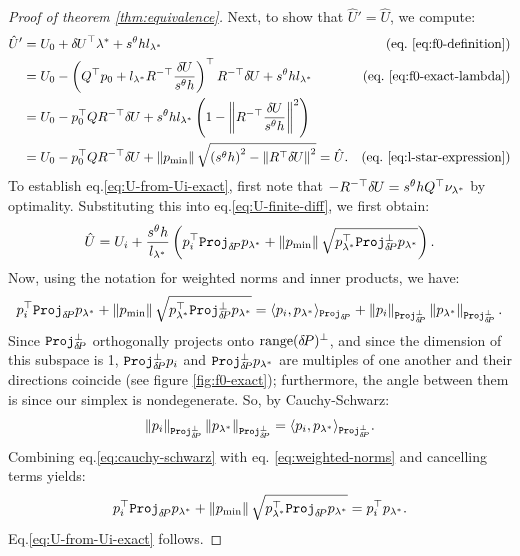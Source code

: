 \documentclass[smallcondensed]{svjour3}
\begin{document}
\begin{proof}[Proof of theorem \ref{thm:equivalence}]
  Next, to show that $\hat{U}' = \hat{U}$, we compute:
  \begin{align*}
    \hat{U}'
    &= U_0 + \delU^\top \lambda^* + s^\theta h l_{\lambda^*} & \mbox{(eq.\@ \ref{eq:f0-definition})} \\
    &= U_0 - \parens{Q^\top p_0 + l_{\lambda^*} R^{-\top} \frac{\delU}{s^\theta h}}^\top R^{-\top} \delU + s^\theta h l_{\lambda^*} & \mbox{(eq.\@ \ref{eq:f0-exact-lambda})} \\
    &= U_0 - p_0^\top Q R^{-\top} \delU + s^\theta h l_{\lambda^*} \parens{1 - \norm{R^{-\top} \frac{\delU}{s^\theta h}}^2} \\
    &= U_0 - p_0^\top Q R^{-\top} \delU + \norm{\pmin} \sqrt{\parens{s^\theta h}^2 - \norm{R^\top \delU}^2} = \hat{U}. & \mbox{(eq.\@ \ref{eq:l-star-expression})}
  \end{align*}
  To establish eq.\@ \ref{eq:U-from-Ui-exact}, first note that
  $-R^{-\top} {\delta \hspace{-0.09em} U} = s^\theta h Q^\top \nu_{\lambda^*}$ by
  optimality. Substituting this into eq.\@ \ref{eq:U-finite-diff},
  we first obtain:
  \begin{equation}
    \hat{U} = U_i + \frac{s^\theta h}{l_{\lambda^*}} \left(p_i^\top \mathtt{Proj}_{{\delta \hspace{-0.14em} P}} p_{\lambda^*} + \left\|p_{\operatorname{min}}\right\| \sqrt{p_{\lambda^*}^\top \mathtt{Proj}^\perp_{{\delta \hspace{-0.14em} P}} p_{\lambda^*}}\right).
  \end{equation}
  Now, using the notation for weighted norms and inner products, we have:
  \begin{equation}\label{eq:weighted-norms}
    p_i^\top \mathtt{Proj}_{{\delta \hspace{-0.14em} P}} p_{\lambda^*} + \left\|p_{\operatorname{min}}\right\| \sqrt{p_{\lambda^*}^\top \mathtt{Proj}^\perp_{{\delta \hspace{-0.14em} P}} p_{\lambda^*}} = \langle p_i, p_{\lambda^*} \rangle_{\mathtt{Proj}_{{\delta \hspace{-0.14em} P}}} + \left\|p_i\right\|_{\mathtt{Proj}^\perp_{{\delta \hspace{-0.14em} P}}} \left\|p_{\lambda^*}\right\|_{\mathtt{Proj}^\perp_{{\delta \hspace{-0.14em} P}}}.
  \end{equation}
  Since $\mathtt{Proj}^\perp_{{\delta \hspace{-0.14em} P}}$ orthogonally projects onto
  $\operatorname{range}({\delta \hspace{-0.14em} P})^\perp$, and since the dimension of this subspace is
  1, $\mathtt{Proj}^\perp_{{\delta \hspace{-0.14em} P}} p_i$ and
  $\mathtt{Proj}^\perp_{{\delta \hspace{-0.14em} P}} p_{\lambda^*}$ are multiples of one
  another and their directions coincide (see figure
  \ref{fig:f0-exact}); furthermore, the angle between them is since
  our simplex is nondegenerate. So, by Cauchy-Schwarz:
  \begin{equation}\label{eq:cauchy-schwarz}
    \left\|p_i\right\|_{\mathtt{Proj}^\perp_{{\delta \hspace{-0.14em} P}}} \left\|p_{\lambda^*}\right\|_{\mathtt{Proj}^\perp_{{\delta \hspace{-0.14em} P}}} = \langle p_i, p_{\lambda^*} \rangle_{\mathtt{Proj}^\perp_{{\delta \hspace{-0.14em} P}}}.
  \end{equation}
  Combining eq.\@ \ref{eq:cauchy-schwarz} with eq.\@
  \ref{eq:weighted-norms} and cancelling terms yields:
  \begin{equation}
    p_i^\top \mathtt{Proj}_{{\delta \hspace{-0.14em} P}} p_{\lambda^*} + \left\|p_{\operatorname{min}}\right\| \sqrt{p_{\lambda^*}^\top \mathtt{Proj}_{{\delta \hspace{-0.14em} P}} p_{\lambda^*}} = p_i^\top p_{\lambda^*}.
  \end{equation}
  Eq.\@ \ref{eq:U-from-Ui-exact} follows.


\end{proof}
\end{document}

